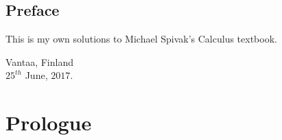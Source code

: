 \documentclass[a4paper,11pt]{memoir}
\theoremstyle{plain} \newtheorem{id}{Lemma}
\theoremstyle{definition} \newtheorem{pr}{Problem}[chapter]
\theoremstyle{remark}\newtheorem*{ab}{Remark}
\begin{document}
  \chapter{Preface}
    This is my own solutions to Michael Spivak's Calculus
    textbook.

    \flushright
    Vantaa, Finland \\
    $25^{th}$ June, $2017$.
  \clearpage
  \tableofcontents

\mainmatter
  \renewcommand{\partnote}{
  This page is intentionally left blank.
  }
  \part{Prologue}
    
    
\end{document}
